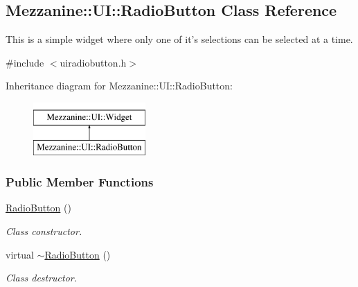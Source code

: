 \hypertarget{classMezzanine_1_1UI_1_1RadioButton}{
\subsection{Mezzanine::UI::RadioButton Class Reference}
\label{classMezzanine_1_1UI_1_1RadioButton}
}


This is a simple widget where only one of it's selections can be selected at a time.  




{\ttfamily \#include $<$uiradiobutton.h$>$}

Inheritance diagram for Mezzanine::UI::RadioButton:\begin{figure}[H]
\begin{center}
\leavevmode
\includegraphics[height=2.000000cm]{classMezzanine_1_1UI_1_1RadioButton}
\end{center}
\end{figure}
\subsubsection*{Public Member Functions}
\begin{DoxyCompactItemize}
\item 
\hypertarget{classMezzanine_1_1UI_1_1RadioButton_ad9f3597aeafcb5bb71ff4a70590f3145}{
\hyperlink{classMezzanine_1_1UI_1_1RadioButton_ad9f3597aeafcb5bb71ff4a70590f3145}{RadioButton} ()}
\label{classMezzanine_1_1UI_1_1RadioButton_ad9f3597aeafcb5bb71ff4a70590f3145}

\begin{DoxyCompactList}\small\item\em Class constructor. \item\end{DoxyCompactList}\item 
\hypertarget{classMezzanine_1_1UI_1_1RadioButton_ac05ea816b0eb7cebaad69038ab50e982}{
virtual \hyperlink{classMezzanine_1_1UI_1_1RadioButton_ac05ea816b0eb7cebaad69038ab50e982}{$\sim$RadioButton} ()}
\label{classMezzanine_1_1UI_1_1RadioButton_ac05ea816b0eb7cebaad69038ab50e982}

\begin{DoxyCompactList}\small\item\em Class destructor. \item\end{DoxyCompactList}\end{DoxyCompactItemize}



